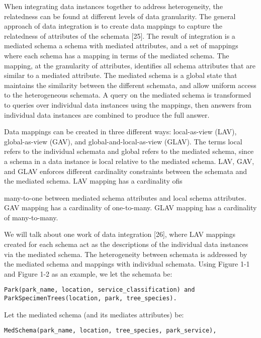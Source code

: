 When integrating data instances together to address heterogeneity, the relatedness can be found at different levels of data granularity. The general approach of data integration is to create data mappings to capture the relatedness of attributes of the schemata [25]. The result of integration is a mediated schema a schema with mediated attributes, and a set of mappings where each schema has a mapping in terms of the mediated schema. The mapping, at the granularity of attributes, identifies all schema attributes that are similar to a mediated attribute. The mediated schema is a global state that maintains the similarity between the different schemata, and allow uniform access to the heterogeneous schemata. A query on the mediated schema is transformed to queries over individual data instances using the mappings, then answers from individual data instances are combined to produce the full answer.

Data mappings can be created in three different ways: local-as-view (LAV), global-as-view (GAV), and global-and-local-as-view (GLAV). The terms local refers to the individual schemata and global refers to the mediated schema, since a schema in a data instance is local relative to the mediated schema. LAV, GAV, and GLAV enforces different cardinality constraints between the schemata and the mediated schema. LAV mapping has a cardinality ofis

many-to-one between mediated schema attributes and local schema attributes. GAV mapping has a cardinality of one-to-many. GLAV mapping has a cardinality of many-to-many.

We will talk about one work of data integration [26], where LAV mappings created for each schema act as the descriptions of the individual data instances via the mediated schema. The heterogeneity between schemata is addressed by the mediated schema and mappings with individual schemata. Using Figure 1-1 and Figure 1-2 as an example, we let the schemata be:

\begin{lstlisting}
Park(park_name, location, service_classification) and
ParkSpecimenTrees(location, park, tree_species).
\end{lstlisting}

Let the mediated schema (and its mediates attributes) be:

\begin{lstlisting}
MedSchema(park_name, location, tree_species, park_service),
\end{lstlisting}

